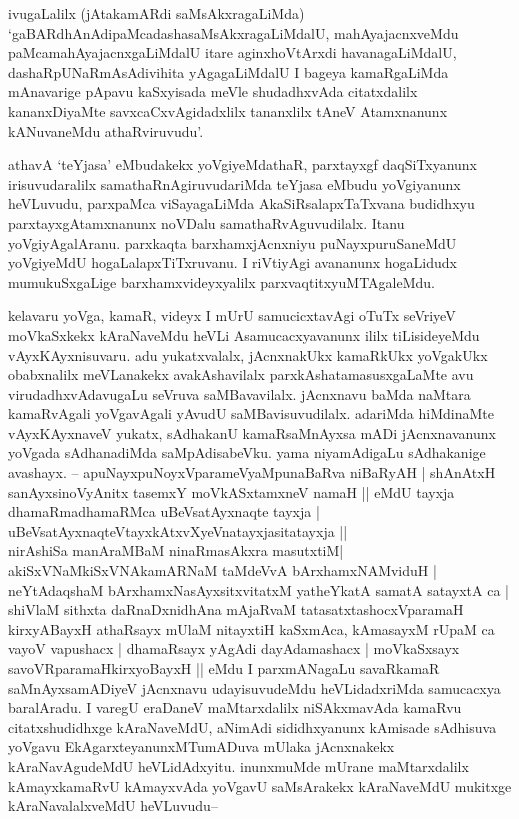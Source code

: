\begin{artha}
ivugaLalilx (jAtakamARdi saMsAkxragaLiMda) `gaBARdhAnAdipaMcadashasaMsAkxragaLiMdalU, mahAyajacnxveMdu paMcamahAyajacnxgaLiMdalU itare aginxhoVtArxdi havanagaLiMdalU, dashaRpUNaRmAsAdivihita yAgagaLiMdalU I bageya kamaRgaLiMda mAnavarige pApavu kaSxyisada meVle shudadhxvAda citatxdalilx kananxDiyaMte savxcaCxvAgidadxlilx tananxlilx tAneV Atamxnanunx kANuvaneMdu athaRviruvudu'. 

athavA `teYjasa' eMbudakekx yoVgiyeMdathaR, parxtayxgf daqSiTxyanunx irisuvudaralilx samathaRnAgiruvudariMda teYjasa eMbudu yoVgiyanunx heVLuvudu, parxpaMca viSayagaLiMda AkaSiRsalapxTaTxvana budidhxyu parxtayxgAtamxnanunx noVDalu samathaRvAguvudilalx. Itanu yoVgiyAgalAranu. parxkaqta barxhamxjAcnxniyu puNayxpuruSaneMdU yoVgiyeMdU hogaLalapxTiTxruvanu. I riVtiyAgi avananunx hogaLidudx mumukuSxgaLige barxhamxvideyxyalilx parxvaqtitxyuMTAgaleMdu. 

kelavaru yoVga, kamaR, videyx I mUrU samucicxtavAgi oTuTx seVriyeV moVkaSxkekx kAraNaveMdu heVLi Asamucacxyavanunx ililx tiLisideyeMdu vAyxKAyxnisuvaru. adu yukatxvalalx, jAcnxnakUkx kamaRkUkx yoVgakUkx obabxnalilx meVLanakekx avakAshavilalx parxkAshatamasusxgaLaMte avu virudadhxvAdavugaLu seVruva saMBavavilalx. jAcnxnavu baMda naMtara kamaRvAgali yoVgavAgali yAvudU saMBavisuvudilalx. adariMda hiMdinaMte vAyxKAyxnaveV yukatx, sAdhakanU kamaRsaMnAyxsa mADi jAcnxnavanunx yoVgada sAdhanadiMda saMpAdisabeVku. yama niyamAdigaLu sAdhakanige avashayx. {\rm --} apuNayxpuNoyxVparameVyaMpunaBaRva niBaRyAH | shAnAtxH sanAyxsinoVyAnitx tasemxY moVkASxtamxneV namaH || eMdU tayxja dhamaRmadhamaRMca uBeVsatAyxnaqte tayxja |\\
uBeVsatAyxnaqteVtayxkAtxvXyeVnatayxjasitatayxja ||\\
nirAshiSa manAraMBaM ninaRmasAkxra masutxtiM|\\
akiSxVNaMkiSxVNAkamARNaM taMdeVvA bArxhamxNAMviduH |\\
neYtAdaqshaM bArxhamxNasAyxsitxvitatxM yatheYkatA samatA satayxtA ca | shiVlaM sithxta daRnaDxnidhAna mAjaRvaM tatasatxtashocxVparamaH kirxyABayxH athaRsayx mUlaM nitayxtiH kaSxmAca, kAmasayxM rUpaM ca vayoV vapushacx | dhamaRsayx yAgAdi dayAdamashacx | moVkaSxsayx savoVRparamaHkirxyoBayxH || eMdu I parxmANagaLu savaRkamaR saMnAyxsamADiyeV jAcnxnavu udayisuvudeMdu heVLidadxriMda samucacxya baralAradu. I varegU eraDaneV maMtarxdalilx niSAkxmavAda kamaRvu citatxshudidhxge kAraNaveMdU, aNimAdi sididhxyanunx kAmisade sAdhisuva yoVgavu EkAgarxteyanunxMTumADuva mUlaka jAcnxnakekx kAraNavAgudeMdU heVLidAdxyitu. inunxmuMde mUrane maMtarxdalilx kAmayxkamaRvU kAmayxvAda yoVgavU saMsArakekx kAraNaveMdU mukitxge kAraNavalalxveMdU heVLuvudu{\rm --}
\end{artha}

